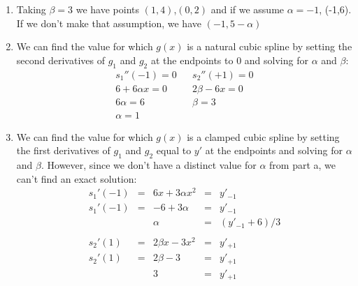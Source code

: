 \documentclass[11pt,a4paper]{article}
\begin{document}
\begin{itemize}
\begin{enumerate} [label={\alph*)}]
					\item Taking $\beta = 3$ we have points $(1,4)$,$(0,2)$ and if we assume $\alpha=-1$, (-1,6). If we don't make that assumption, we have $(-1,5-\alpha)$
					\item We can find the value for which $g(x)$ is a natural cubic spline by setting the second derivatives of $g_1$ and $g_2$ at the endpoints to 0 and solving for $\alpha$ and $\beta$:
					$$\begin{array}{ccc}
					s_1''(-1) = 0 & & s_2''(+1) = 0 \\
					6+6\alpha x = 0 & & 2\beta - 6x = 0 \\
					6\alpha=6 & & \beta = 3 \\
					\alpha=1 & &
					\end{array}$$
					\item We can find the value for which $g(x)$ is a clamped cubic spline by setting the first derivatives of $g_1$ and $g_2$ equal to $y'$ at the endpoints and solving for $\alpha$ and $\beta$. However, since we don't have a distinct value for $\alpha$ from part a, we can't find an exact solution:
					$$\begin{array}{ccccc}
					s_1'(-1) & = & 6x + 3\alpha x^2& = & y'_{-1} \\
					s_1'(-1) & = & -6 + 3\alpha & = & y'_{-1} \\
					 & & \alpha & = & (y'_{-1} + 6)/3 \\
					  & & & & \\
					s_2'(1) & = & 2 \beta x - 3 x^2& = & y'_{+1} \\
					s_2'(1) & = & 2 \beta- 3 & = & y'_{+1} \\
					& & 3 & = & y'_{+1}
					\end{array}$$
				\end{enumerate}
				

\end{itemize}
\end{document}
